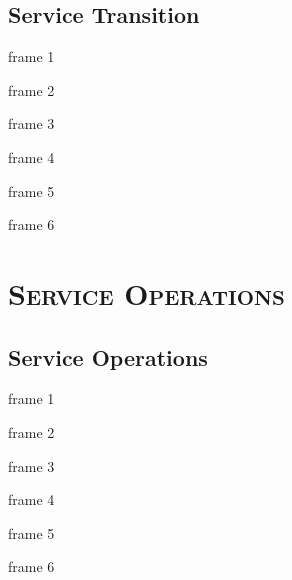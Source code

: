 \documentclass[xcolor=x11names,compress]{beamer}
\renewcommand{\(}{\begin{columns}}
\renewcommand{\)}{\end{columns}}
\newcommand{\<}[1]{\begin{column}{#1}}
\renewcommand{\>}{\end{column}}
\begin{document}
\subsection{Service Transition}
\begin{frame}{frame 1}

\end{frame}
\begin{frame}{frame 2}

\end{frame}
\begin{frame}{frame 3}

\end{frame}
\begin{frame}{frame 4}

\end{frame}
\begin{frame}{frame 5}

\end{frame}
\begin{frame}{frame 6}

\end{frame}
\section{\scshape Service Operations}
\subsection{Service Operations}
\begin{frame}{frame 1}

\end{frame}
\begin{frame}{frame 2}

\end{frame}
\begin{frame}{frame 3}

\end{frame}
\begin{frame}{frame 4}

\end{frame}
\begin{frame}{frame 5}

\end{frame}
\begin{frame}{frame 6}

\end{frame}
\end{document}
